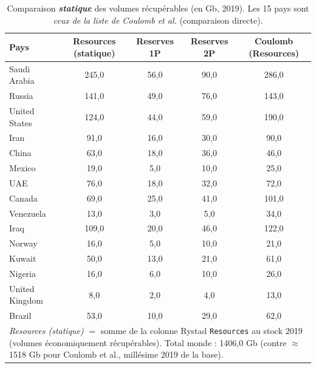 \documentclass[11pt]{article}
\begin{document}
\begin{table}[htbp]
\centering
\caption{Comparaison \textbf{\textit{statique}} des volumes récupérables (en Gb, 2019). Les 15 pays sont \emph{ceux de la liste de Coulomb et al.} (comparaison directe).}
\label{tab:resources_comparison}
\begin{tabular}{lcccc}
\toprule
\textbf{Pays} & \textbf{Resources (statique)} & \textbf{Reserves 1P} & \textbf{Reserves 2P} & \textbf{Coulomb (Resources)} \\
\midrule
Saudi Arabia & 245{,}0 & 56{,}0 & 90{,}0 & 286{,}0 \\
Russia & 141{,}0 & 49{,}0 & 76{,}0 & 143{,}0 \\
United States & 124{,}0 & 44{,}0 & 59{,}0 & 190{,}0 \\
Iran & 91{,}0 & 16{,}0 & 30{,}0 & 90{,}0 \\
China & 63{,}0 & 18{,}0 & 36{,}0 & 46{,}0 \\
Mexico & 19{,}0 & 5{,}0 & 10{,}0 & 25{,}0 \\
UAE & 76{,}0 & 18{,}0 & 32{,}0 & 72{,}0 \\
Canada & 69{,}0 & 25{,}0 & 41{,}0 & 101{,}0 \\
Venezuela & 13{,}0 & 3{,}0 & 5{,}0 & 34{,}0 \\
Iraq & 109{,}0 & 20{,}0 & 46{,}0 & 122{,}0 \\
Norway & 16{,}0 & 5{,}0 & 10{,}0 & 21{,}0 \\
Kuwait & 50{,}0 & 13{,}0 & 21{,}0 & 61{,}0 \\
Nigeria & 16{,}0 & 6{,}0 & 10{,}0 & 26{,}0 \\
United Kingdom & 8{,}0 & 2{,}0 & 4{,}0 & 13{,}0 \\
Brazil & 53{,}0 & 10{,}0 & 29{,}0 & 62{,}0 \\
\bottomrule
\multicolumn{5}{p{15cm}}{\small \emph{Resources (statique)} $=$ somme de la colonne Rystad \texttt{Resources} au stock 2019 (volumes économiquement récupérables). Total monde : 1406{,}0 Gb (contre $\approx$ 1518 Gb pour Coulomb et al., millésime 2019 de la base).} \\
\end{tabular}
\end{table}
\end{document}
